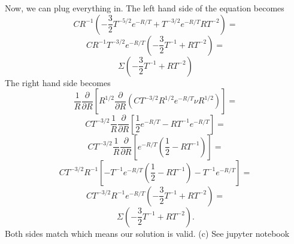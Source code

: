 \documentclass[11pt]{article}
\begin{document}
Now, we can plug everything in.
The left hand side of the equation becomes
\begin{equation}
 C R^{-1} \left( -\frac{3}{2} T^{-5/2} e^{-R/T} + T^{-3/2} e^{-R/T} R T^{-2}  \right) =
\end{equation}
\begin{equation}
 C R^{-1} T^{-3/2} e^{-R / T} \left( -\frac{3}{2} T^{-1} + RT^{-2}  \right) =
\end{equation}
\begin{equation}
\Sigma \left( -\frac{3}{2} T^{-1} + RT^{-2}  \right)
\end{equation}
The right hand side becomes
\begin{equation}
\frac{1}{R} \frac{\partial }{\partial R} \left[ R^{1/2} \frac{\partial }{\partial R} \left( C T^{-3/2} R^{1/2} e^{-R/T} \nu R^{1/2} \right)  \right] =
\end{equation}
\begin{equation}
 C T^{-3/2} \frac{1}{R} \frac{\partial }{\partial R} \left[  \frac{1}{2} e^{-R/T} - R T^{-1} e^{-R/T}  \right] =
\end{equation}
\begin{equation}
 C T^{-3/2} \frac{1}{R} \frac{\partial }{\partial R} \left[ e^{-R/T}\left( \frac{1}{2} - R T^{-1} \right)  \right] =
\end{equation}
\begin{equation}
 C T^{-3/2} R^{-1} \left[ -T^{-1} e^{-R/T} \left( \frac{1}{2} - RT^{-1} \right) - T^{-1}e^{-R/T}  \right] =
\end{equation}
\begin{equation}
 C T^{-3/2} R^{-1} e^{-R/T} \left( -\frac{3}{2} T^{-1} + RT^{-2} \right) =
\end{equation}
\begin{equation}
 \Sigma \left( -\frac{3}{2} T^{-1} + RT^{-2} \right) .
\end{equation}
Both sides match which means our solution is valid.
\newline
(c) See jupyter notebook
\end{document}
